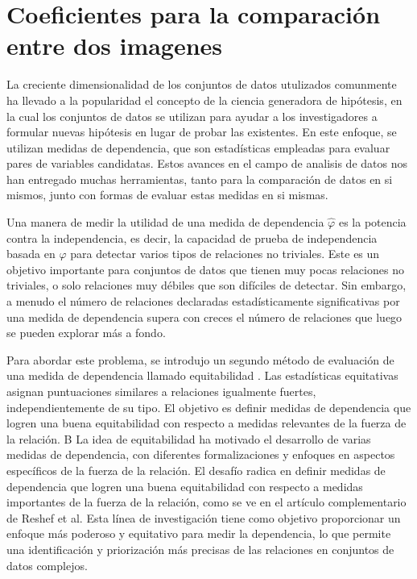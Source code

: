 \chapter{Coeficientes para la comparaci\'on entre dos imagenes}\label{chap3}

La creciente dimensionalidad de los conjuntos de datos utulizados comunmente ha llevado a la popularidad el concepto de la ciencia generadora de hip\'otesis, en la cual los conjuntos de datos se utilizan para ayudar a los investigadores a formular nuevas hip\'otesis en lugar de probar las existentes. En este enfoque, se utilizan medidas de dependencia, que son estad\'isticas empleadas para evaluar pares de variables candidatas. Estos avances en el campo de analisis de datos nos han entregado muchas herramientas, tanto para la comparaci\'on de datos en si mismos, junto con formas de evaluar estas medidas en si mismas. 

Una manera de medir la utilidad de una medida de dependencia $\hat\varphi$ es la potencia contra la independencia, es decir, la capacidad de prueba de independencia basada en $\hat\varphi$ para detectar varios tipos de relaciones no triviales. Este es un objetivo importante para conjuntos de datos que tienen muy pocas relaciones no triviales, o solo relaciones muy d\'ebiles que son dif\'iciles de detectar. Sin embargo, a menudo el n\'umero de relaciones declaradas estad\'isticamente significativas por una medida de dependencia supera con creces el n\'umero de relaciones que luego se pueden explorar m\'as a fondo.

Para abordar este problema, se introdujo un segundo m\'etodo de evaluaci\'on de una medida de dependencia llamado equitabilidad \cite{Reshef2011}. Las estad\'isticas equitativas asignan puntuaciones similares a relaciones igualmente fuertes, independientemente de su tipo. El objetivo es definir medidas de dependencia que logren una buena equitabilidad con respecto a medidas relevantes de la fuerza de la relaci\'on. 
B
La idea de equitabilidad ha motivado el desarrollo de varias medidas de dependencia, con diferentes formalizaciones y enfoques en aspectos espec\'ificos de la fuerza de la relaci\'on. El desaf\'io radica en definir medidas de dependencia que logren una buena equitabilidad con respecto a medidas importantes de la fuerza de la relaci\'on, como se ve en el art\'iculo complementario de Reshef et al. Esta l\'inea de investigaci\'on tiene como objetivo proporcionar un enfoque m\'as poderoso y equitativo para medir la dependencia, lo que permite una identificaci\'on y priorizaci\'on m\'as precisas de las relaciones en conjuntos de datos complejos.

